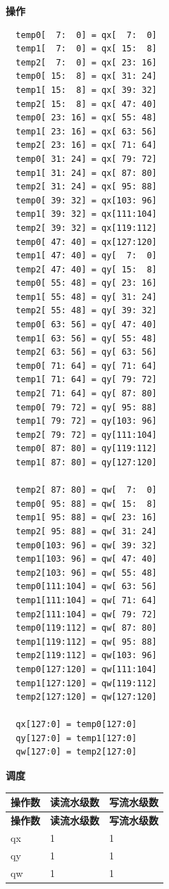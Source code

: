 \textbf{操作}\\
\begin{lstlisting}
  temp0[  7:  0] = qx[  7:  0]
  temp1[  7:  0] = qx[ 15:  8]
  temp2[  7:  0] = qx[ 23: 16]
  temp0[ 15:  8] = qx[ 31: 24]
  temp1[ 15:  8] = qx[ 39: 32]
  temp2[ 15:  8] = qx[ 47: 40]
  temp0[ 23: 16] = qx[ 55: 48]
  temp1[ 23: 16] = qx[ 63: 56]
  temp2[ 23: 16] = qx[ 71: 64]
  temp0[ 31: 24] = qx[ 79: 72]
  temp1[ 31: 24] = qx[ 87: 80]
  temp2[ 31: 24] = qx[ 95: 88]
  temp0[ 39: 32] = qx[103: 96]
  temp1[ 39: 32] = qx[111:104]
  temp2[ 39: 32] = qx[119:112]
  temp0[ 47: 40] = qx[127:120]
  temp1[ 47: 40] = qy[  7:  0]
  temp2[ 47: 40] = qy[ 15:  8]
  temp0[ 55: 48] = qy[ 23: 16]
  temp1[ 55: 48] = qy[ 31: 24]
  temp2[ 55: 48] = qy[ 39: 32]
  temp0[ 63: 56] = qy[ 47: 40]
  temp1[ 63: 56] = qy[ 55: 48]
  temp2[ 63: 56] = qy[ 63: 56]
  temp0[ 71: 64] = qy[ 71: 64]
  temp1[ 71: 64] = qy[ 79: 72]
  temp2[ 71: 64] = qy[ 87: 80]
  temp0[ 79: 72] = qy[ 95: 88]
  temp1[ 79: 72] = qy[103: 96]
  temp2[ 79: 72] = qy[111:104]
  temp0[ 87: 80] = qy[119:112]
  temp1[ 87: 80] = qy[127:120]

  temp2[ 87: 80] = qw[  7:  0]
  temp0[ 95: 88] = qw[ 15:  8]
  temp1[ 95: 88] = qw[ 23: 16]
  temp2[ 95: 88] = qw[ 31: 24]
  temp0[103: 96] = qw[ 39: 32]
  temp1[103: 96] = qw[ 47: 40]
  temp2[103: 96] = qw[ 55: 48]
  temp0[111:104] = qw[ 63: 56]
  temp1[111:104] = qw[ 71: 64]
  temp2[111:104] = qw[ 79: 72]
  temp0[119:112] = qw[ 87: 80]
  temp1[119:112] = qw[ 95: 88]
  temp2[119:112] = qw[103: 96]
  temp0[127:120] = qw[111:104]
  temp1[127:120] = qw[119:112]
  temp2[127:120] = qw[127:120]

  qx[127:0] = temp0[127:0]
  qy[127:0] = temp1[127:0]
  qw[127:0] = temp2[127:0]

\end{lstlisting}

\textbf{调度}\\
\begin{longtable}[c]{|l|l|l|}
    \hline
    \rowcolor{lightgray}
    \textbf{操作数} & \textbf{读流水级数} & \textbf{写流水级数} \\\hline
    \endfirsthead
    \hline
    \rowcolor{lightgray}
     \textbf{操作数} & \textbf{读流水级数} & \textbf{写流水级数} \\\hline
    \endhead
    \hline
    \endfoot

  qx & 1 & 1 \\\hline
  qy & 1 & 1 \\\hline
  qw & 1 & 1

\end{longtable}

